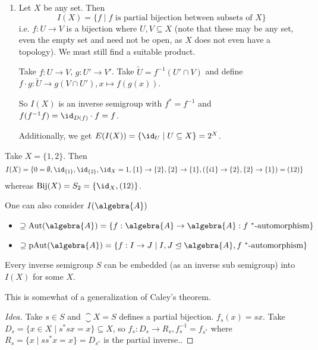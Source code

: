 \documentclass[a4paper]{article}
\begin{document}
\begin{example}
\begin{enumerate}
		\item Let $X$ be any set. Then
		\begin{equation*}
			I(X) = \{ f \mid f \text{ is partial bijection between subsets of } X \}
		\end{equation*}
		i.e. $f: U \to V$ is a bijection where $U,V \subseteq X$ (note that these may be any set, even the empty set and need not be open, as $X$ does not even have a topology).
		We must still find a suitable product.

		Take $f: U \to V$, $g: U' \to V'$. Take $\tilde{U} = f^{-1}(U' \cap V)$ and define $f \cdot g: \tilde{U} \to g(V \cap U'), x \mapsto f(g(x))$.

		So $I(X)$ is an inverse semigroup with $f^* = f^{-1}$ and $f(f^{-1}f) = \id_{D(f)} \cdot f = f$.

		Additionally, we get $E(I(X)) = \{ \id_U \mid U \subseteq X \} = 2^X$.
 	\end{enumerate}
\end{example}

\begin{example}[About $I(X)$]
	Take $X = \{1,2\}$. Then 
	\begin{equation*}
		I(X) = \{ 0 = \emptyset, \id_{\{1\}}, \id_{\{2\}}, \id_X = 1, \{1\} \to \{2\}, \{2\} \to \{1\}, (\{i1\} \to \{2\}, \{2\} \to \{1\}) = (12)  \}
	\end{equation*}
	whereas $\mathrm{Bij}(X) = S_2 = \{\id_X, (12)\}$.

	One can also consider $I(\algebra{A}) $
	\begin{itemize}
		\item $\supseteq \mathrm{Aut}(\algebra{A}) = \{f: \algebra{A} \to \algebra{A} : f ~^*\text{-automorphism} \}$
		\item $\supseteq \mathrm{pAut}(\algebra{A}) = \{ f: I \to J \mid I,J \trianglelefteq \algebra{A}, f ~^*\text{-automorphism} \}$
	\end{itemize}
\end{example}

\begin{theorem}
	Every inverse semigroup $S$ can be embedded (as an inverse sub semigroup) into $I(X)$ for some $X$.

	This is somewhat of a generalization of Caley's theorem.
\end{theorem}

\begin{proof}[Idea]
	Take $s \in S$ and $\closure{X} = S$ defines a partial bijection.
	$f_s(x) = sx$. 
	Take $D_s = \{ x \in X \mid s^*s x = x \} \subseteq X$, so $f_s: D_s \to R_s, f^{-1}_s = f_{s^*}$ where $R_s = \{x \mid s s^* x = x\} = D_{s^*}$ is the partial inverse..
\end{proof}
\end{document}
